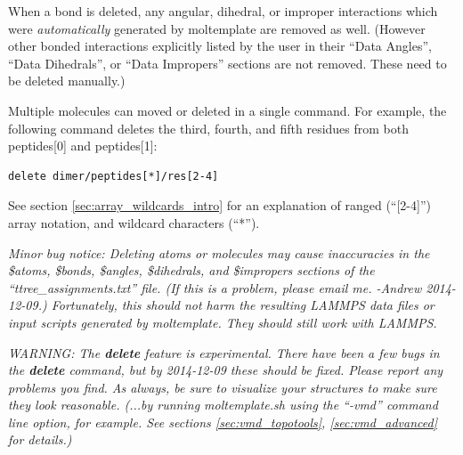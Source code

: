 \documentclass[11pt]{article}
\begin{document}

When a bond is deleted, any angular, dihedral, or improper 
interactions which were \textit{automatically} 
generated by moltemplate are removed as well.
(However other bonded interactions explicitly listed by the user in their
``Data Angles'', ``Data Dihedrals'', or ``Data Impropers'' sections
are not removed.  These need to be deleted manually.)

Multiple molecules can moved or deleted in a single command.  For example,
the following command deletes the third, fourth, and fifth residues from 
both peptides[0] and peptides[1]:
\begin{verbatim}
delete dimer/peptides[*]/res[2-4]
\end{verbatim}
See section \ref{sec:array_wildcards_intro} for an
explanation of ranged (``[2-4]'') array notation, 
and wildcard characters (``*'').

\textit{Minor bug notice: 
Deleting atoms or molecules may cause 
inaccuracies in the \$atoms, \$bonds, \$angles, \$dihedrals, and \$impropers
sections of the ``ttree\_assignments.txt'' file.
(If this is a problem, please email me. -Andrew 2014-12-09.)
Fortunately, this should not harm the resulting LAMMPS data files or input
scripts generated by moltemplate.  They should still work with LAMMPS.}

\textit{WARNING: The \textbf{delete} feature is experimental.
There have been a few bugs in the \textbf{delete} command, but by 2014-12-09
these should be fixed.  Please report any problems you find.
As always, be sure to visualize your structures 
to make sure they look reasonable.
(...by running moltemplate.sh using the 
 ``-vmd'' command line option, for example.
 See sections \ref{sec:vmd_topotools}, \ref{sec:vmd_advanced} for details.)}



\end{document}
